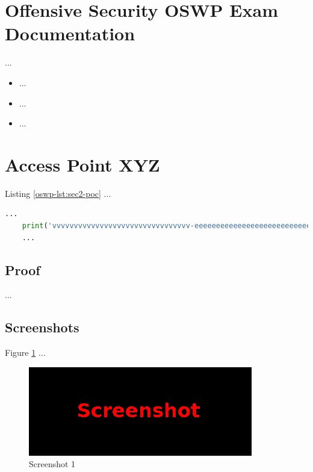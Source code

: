 %
%
%
\section{Offensive Security OSWP Exam Documentation}\label{oswp-sec:sec1}
%
...

\begin{itemize}
    \item ...
    \item ...
    \item ...
\end{itemize}
%
%
%
\section{Access Point XYZ}\label{oswp-sec:sec2}
%
Listing \ref{oswp-lst:sec2-poc} ...\\

\begin{lstlisting}[language=Python,caption={Proof of Concept}, label={oswp-lst:sec2-poc}]
    ...
    print('vvvvvvvvvvvvvvvvvvvvvvvvvvvvvvvv-eeeeeeeeeeeeeeeeeeeeeeeeeeeeeeeeeeeeeeeeeee-looooooooooooooooooooooong-striiiiiiiiiiiiiing')
    ...
\end{lstlisting}
%
%
%
\subsection{Proof}\label{oswp-sec:sec2-proof}
%
...
%
%
%
\subsection{Screenshots}\label{oswp-sec:sec2-screens}
%
Figure \ref{oswp-fig:sec2-screen1} ...

\begin{figure}[H]
    \centering
    \includegraphics[width=\textwidth]{img/assignment1/screen1.png}
    \caption{Screenshot 1}\label{oswp-fig:sec2-screen1}
\end{figure}
%
%
%
